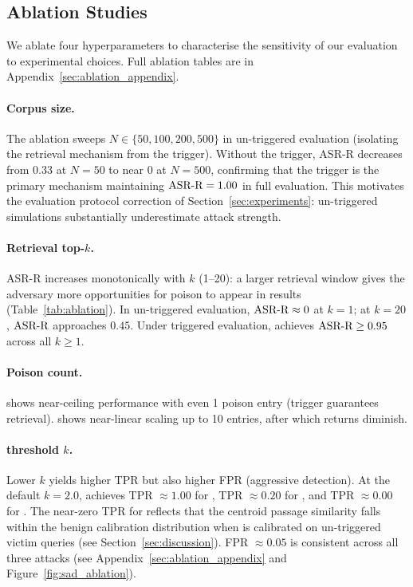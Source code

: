 \subsection{Ablation Studies}
\label{sec:ablation}

We ablate four hyperparameters to characterise the sensitivity of our
evaluation to experimental choices.  Full ablation tables are in
Appendix~\ref{sec:ablation_appendix}.

\paragraph{Corpus size.}
The ablation sweeps $N \in \{50, 100, 200, 500\}$ in un-triggered evaluation
(isolating the retrieval mechanism from the trigger).  Without the trigger,
ASR-R decreases from $0.33$ at $N=50$ to near $0$ at $N=500$, confirming
that the trigger is the primary mechanism maintaining $\text{ASR-R}=1.00$ in
full evaluation.  This motivates the evaluation protocol correction of
Section~\ref{sec:experiments}: un-triggered simulations substantially
underestimate attack strength.

\paragraph{Retrieval top-\texorpdfstring{$k$}{k}.}
ASR-R increases monotonically with $k$ (1--20): a larger retrieval window
gives the adversary more opportunities for poison to appear in results
(Table~\ref{tab:ablation}).  In un-triggered evaluation, $\text{ASR-R} \approx 0$
at $k=1$; at $k=20$, $\text{ASR-R}$ approaches $0.45$.  Under triggered evaluation,
\agentpoison{} achieves $\text{ASR-R} \geq 0.95$ across all $k \geq 1$.

\paragraph{Poison count.}
\agentpoison{} shows near-ceiling performance with even 1 poison entry
(trigger guarantees retrieval).  \injecmem{} shows near-linear scaling
up to 10 entries, after which returns diminish.

\paragraph{\sad{} threshold \texorpdfstring{$k$}{k}.}
Lower $k$ yields higher TPR but also higher FPR (aggressive detection).
At the default $k=2.0$, \sad{} achieves TPR $\approx 1.00$ for \minja{},
TPR $\approx 0.20$ for \injecmem{}, and TPR $\approx 0.00$ for \agentpoison{}.
The near-zero TPR for \agentpoison{} reflects that the centroid passage
similarity falls within the benign calibration distribution when \sad{}
is calibrated on un-triggered victim queries (see Section~\ref{sec:discussion}).
FPR $\approx 0.05$ is consistent across all three attacks
(see Appendix~\ref{sec:ablation_appendix} and Figure~\ref{fig:sad_ablation}).

